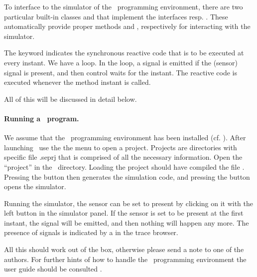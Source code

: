 To interface to the simulator of the \se\ programming environment, 
there are two particular built-in classes 
 and 
 that implement the interfaces  resp. 
. These automatically provide proper methods  
and , respectively  for interacting with 
the simulator.


The keyword  indicates the synchronous reactive code that is to be executed at every instant. We have a loop. In the loop, a signal  is emitted if the (sensor) signal  is present, and then control waits for the  instant. The reactive code is executed whenever the method instant is called.

All of this will be discussed in detail below.



\paragraph{Running a \se\ program.} We assume that the \se\ programming environment has been installed (cf. \cite{userguide}). After launching \se\ use the the menu  to open a project. Projects are
directories with specific file .seprj that is comprised of all the necessary information. Open the ``project''  in the \se\ directory. Loading the project should have compiled the file .  Pressing the button  then generates the
simulation code, and pressing the 
button opens the simulator.

Running the simulator, the sensor  can be set to
present by clicking on it with the left button in the simulator 
panel. If the sensor  is set to be present at the first instant,
the signal  will be emitted, and then nothing will happen
any more. The presence of signals is indicated by a \pp{\$} in the
trace browser.

All this should work out of the box, otherwise please send a note to one of the authors. For further hints of how to handle the \se\ programming environment the user guide should be consulted \cite{userguide}.

